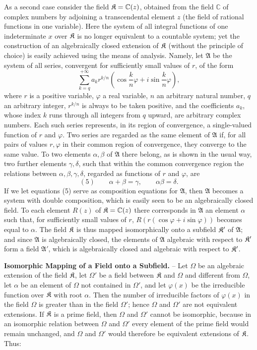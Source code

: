 As a second case consider the field \(\mathfrak K=\mathbb C(z)\), obtained from the field \(\mathbb C\) of complex numbers by adjoining a transcendental element \(z\) (the field of rational functions in one variable). Here the system of all integral functions of one indeterminate \(x\) over \(\mathfrak K\) is no longer equivalent to a countable system; yet the construction of an algebraically closed extension of \(\mathfrak K\) (without the principle of choice) is easily achieved using the means of analysis. Namely, let \(\mathfrak A\) be the system of all series, convergent for sufficiently small values of \(r\), of the form
\[
\sum_{k=q}^{+\infty} a_k r^{k/n}\left(\cos\frac{k}{n}\varphi+i\sin\frac{k}{n}\varphi\right),
\]
where \(r\) is a positive variable, \(\varphi\) a real variable, \(n\) an arbitrary natural number, \(q\) an arbitrary integer, \(r^{k/n}\) is always to be taken positive, and the coefficients \(a_k\), whose index \(k\) runs through all integers from \(q\) upward, are arbitrary complex numbers. Each such series represents, in its region of convergence, a single-valued function of \(r\) and \(\varphi\). Two series are regarded as the same element of \(\mathfrak A\) if, for all pairs of values \(r,\varphi\) in their common region of convergence, they converge to the same value. To two elements \(\alpha,\beta\) of \(\mathfrak A\) there belong, as is shown in the usual way, two further elements \(\gamma,\delta\), such that within the common convergence region the relations between \(\alpha,\beta,\gamma,\delta\), regarded as functions of \(r\) and \(\varphi\), are
\[
(5)\qquad \alpha+\beta=\gamma,\qquad \alpha\beta=\delta.
\]
If we let equations (5) serve as composition equations for \(\mathfrak A\), then \(\mathfrak A\) becomes a system with double composition, which is easily seen to be an algebraically closed field. To each element \(R(z)\) of \(\mathfrak K=\mathbb C(z)\) there corresponds in \(\mathfrak A\) an element \(\alpha\) such that, for sufficiently small values of \(r\), \(R(r(\cos\varphi+i\sin\varphi))\) becomes equal to \(\alpha\). The field \(\mathfrak K\) is thus mapped isomorphically onto a subfield \(\mathfrak K'\) of \(\mathfrak A\); and since \(\mathfrak A\) is algebraically closed, the elements of \(\mathfrak A\) algebraic with respect to \(\mathfrak K'\) form a field \(\mathfrak A'\), which is algebraically closed and algebraic with respect to \(\mathfrak K'\).

\textbf{Isomorphic Mapping of a Field onto a Subfield.} -- Let \(\Omega\) be an algebraic extension of the field \(\mathfrak K\), let \(\Omega'\) be a field between \(\mathfrak K\) and \(\Omega\) and different from \(\Omega\), let \(\alpha\) be an element of \(\Omega\) not contained in \(\Omega'\), and let \(\varphi(x)\) be the irreducible function over \(\mathfrak K\) with root \(\alpha\). Then the number of irreducible factors of \(\varphi(x)\) in the field \(\Omega\) is greater than in the field \(\Omega'\); hence \(\Omega\) and \(\Omega'\) are not equivalent extensions. If \(\mathfrak K\) is a prime field, then \(\Omega\) and \(\Omega'\) cannot be isomorphic, because in an isomorphic relation between \(\Omega\) and \(\Omega'\) every element of the prime field would remain unchanged, and \(\Omega\) and \(\Omega'\) would therefore be equivalent extensions of \(\mathfrak K\). Thus:

